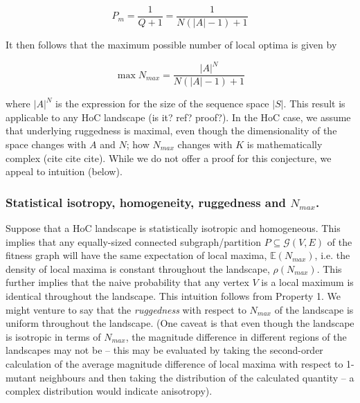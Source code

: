 \documentclass[10pt, reqno]{amsart}
\begin{document}
\begin{equation}
    P_m= \frac{1}{Q+1} = \frac{1}{N(|A|-1)+1} 
\end{equation}

It then follows that the maximum possible number of local optima is given by

\begin{equation}
    \max N_{max} =  \frac{|A|^N}{N(|A|-1)+1}
\end{equation}

where $|A|^N$ is the expression for the size of the sequence space $|S|$. This result is applicable to any HoC landscape (is it? ref? proof?). In the HoC case, we assume that underlying ruggedness is maximal, even though the dimensionality of the space changes with $A$ and $N$; how $N_{max}$ changes with $K$ is mathematically complex (cite cite cite). While we do not offer a proof for this conjecture, we appeal to intuition (below). 

\subsubsection*{Statistical isotropy, homogeneity, ruggedness and $N_{max}$.}

Suppose that a HoC landscape is statistically isotropic and homogeneous. This implies that any equally-sized connected subgraph/partition $P \subseteq \mathcal{G}(V,E) $ of the fitness graph will have the same expectation of local maxima, $\mathbb{E}(N_{max})$, i.e. the density of local maxima is constant throughout the landscape, $\rho(N_{max})$. This further implies that the naive probability that any vertex $V$ is a local maximum is identical throughout the landscape. This intuition follows from Property 1. We might venture to say that the \textit{ruggedness} with respect to $N_{max}$ of the landscape is uniform throughout the landscape. (One caveat is that even though the landscape is isotropic in terms of $N_{max}$, the magnitude difference in different regions of the landscapes may not be -- this may be evaluated by taking the second-order calculation of the average magnitude difference of local maxima with respect to 1-mutant neighbours and then taking the distribution of the calculated quantity -- a complex distribution would indicate anisotropy). \\
\end{document}
